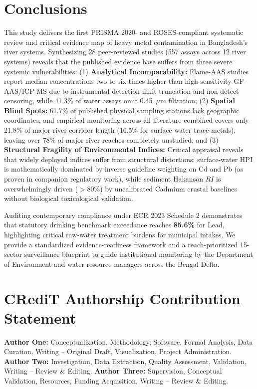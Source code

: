 \documentclass[authoryear,preprint,12pt]{elsarticle}
\begin{document}
\section{Conclusions}
This study delivers the first PRISMA 2020- and ROSES-compliant systematic review and critical evidence map of heavy metal contamination in Bangladesh's river systems. Synthesizing 28 peer-reviewed studies (557 assays across 12 river systems) reveals that the published evidence base suffers from three severe systemic vulnerabilities:
(1) \textbf{Analytical Incomparability:} Flame-AAS studies report median concentrations two to six times higher than high-sensitivity GF-AAS/ICP-MS due to instrumental detection limit truncation and non-detect censoring, while 41.3\% of water assays omit 0.45~$\mu\text{m}$ filtration;
(2) \textbf{Spatial Blind Spots:} 61.7\% of published physical sampling stations lack geographic coordinates, and empirical monitoring across all literature combined covers only 21.8\% of major river corridor length (16.5\% for surface water trace metals), leaving over 78\% of major river reaches completely unstudied; and
(3) \textbf{Structural Fragility of Environmental Indices:} Critical appraisal reveals that widely deployed indices suffer from structural distortions: surface-water $\mathrm{HPI}$ is mathematically dominated by inverse guideline weighting on Cd and Pb (as proven in companion regulatory work), while sediment Hakanson $RI$ is overwhelmingly driven ($>80\%$) by uncalibrated Cadmium crustal baselines without biological toxicological validation.

Auditing contemporary compliance under ECR 2023 Schedule 2 demonstrates that statutory drinking benchmark exceedance reaches \textbf{85.6\%} for Lead, highlighting critical raw-water treatment burdens for municipal intakes. We provide a standardized evidence-readiness framework and a reach-prioritized 15-sector surveillance blueprint to guide institutional monitoring by the Department of Environment and water resource managers across the Bengal Delta.

\section*{CRediT Authorship Contribution Statement}
\textbf{Author One:} Conceptualization, Methodology, Software, Formal Analysis, Data Curation, Writing -- Original Draft, Visualization, Project Administration.
\textbf{Author Two:} Investigation, Data Extraction, Quality Assessment, Validation, Writing -- Review \& Editing.
\textbf{Author Three:} Supervision, Conceptual Validation, Resources, Funding Acquisition, Writing -- Review \& Editing.
\end{document}
